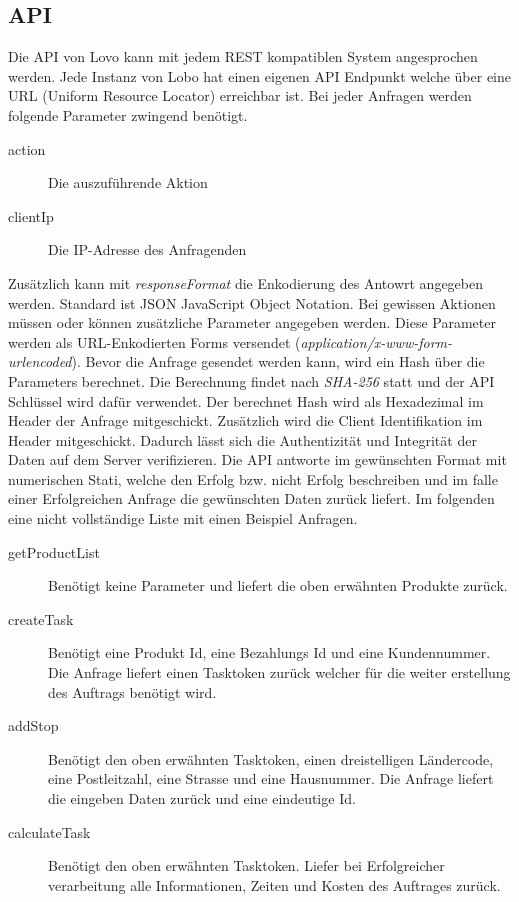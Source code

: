 \subsection{API}

Die API von Lovo kann mit jedem REST kompatiblen System angesprochen werden. Jede Instanz von Lobo hat einen eigenen API Endpunkt welche über eine URL (Uniform Resource Locator) erreichbar ist. Bei jeder Anfragen werden folgende Parameter zwingend benötigt.
\begin{description}
	\item[action] Die auszuführende Aktion
	\item[clientIp] Die IP-Adresse des Anfragenden
\end{description}
Zusätzlich kann mit \textit{responseFormat} die Enkodierung des Antowrt angegeben werden. Standard ist JSON {JavaScript Object Notation}. Bei gewissen Aktionen   müssen oder können zusätzliche Parameter angegeben werden. Diese Parameter werden als URL-Enkodierten Forms versendet (\textit{application/x-www-form-urlencoded}).
Bevor die Anfrage gesendet werden kann, wird ein Hash über die Parameters berechnet. Die Berechnung findet nach \textit{SHA-256} statt und der API Schlüssel wird dafür verwendet. Der berechnet Hash wird als Hexadezimal im Header der Anfrage mitgeschickt. Zusätzlich wird die Client Identifikation im Header mitgeschickt. Dadurch lässt sich die Authentizität und Integrität der Daten auf dem Server verifizieren. Die API antworte im gewünschten Format mit numerischen Stati, welche den Erfolg bzw. nicht Erfolg beschreiben und im falle einer Erfolgreichen Anfrage die gewünschten Daten zurück liefert. Im folgenden eine nicht vollständige Liste mit einen Beispiel Anfragen.

\begin{description}
	\item[getProductList] Benötigt keine Parameter und liefert die oben erwähnten Produkte zurück.
	\item[createTask] Benötigt eine Produkt Id, eine Bezahlungs Id und eine Kundennummer. Die Anfrage liefert einen Tasktoken zurück welcher für die weiter erstellung des Auftrags benötigt wird.
	\item[addStop] Benötigt den oben erwähnten Tasktoken, einen dreistelligen Ländercode, eine Postleitzahl, eine Strasse und eine Hausnummer. Die Anfrage liefert die eingeben Daten zurück und eine eindeutige Id.
	\item[calculateTask] Benötigt den oben erwähnten Tasktoken. Liefer bei Erfolgreicher verarbeitung alle Informationen, Zeiten und Kosten des Auftrages zurück.
\end{description}
